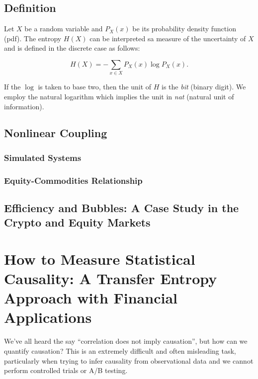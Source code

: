 \documentclass[]{book}
\theoremstyle{definition}
\theoremstyle{definition}
\theoremstyle{definition}
\theoremstyle{remark}
\begin{document}
\section{Definition}\label{definition}

Let \(X\) be a random variable and \(P_X(x)\) be its probability density
function (pdf). The entropy \(H(X)\) can be interpreted sa measure of
the uncertainty of \(X\) and is defined in the discrete case as follows:

\begin{equation}
H(X) = -\sum_{x \in X}{P_X(x)\log{P_X(x)}}.
\label{eq:H}
\end{equation}

If the \(\log\) is taken to base two, then the unit of \(H\) is the
\textit{bit} (binary digit). We employ the natural logarithm which
implies the unit in \textit{nat} (natural unit of information).

\section{Nonlinear Coupling}\label{nonlinear-coupling}

\subsection{Simulated Systems}\label{simulated-systems}

\subsection{Equity-Commodities
Relationship}\label{equity-commodities-relationship}

\section{Efficiency and Bubbles: A Case Study in the Crypto and Equity
Markets}\label{efficiency-and-bubbles-a-case-study-in-the-crypto-and-equity-markets}

\chapter{How to Measure Statistical Causality: A Transfer Entropy
Approach with Financial
Applications}\label{how-to-measure-statistical-causality-a-transfer-entropy-approach-with-financial-applications}

We've all heard the say ``correlation does not imply causation'', but
how can we quantify causation? This is an extremely difficult and often
misleading task, particularly when trying to infer causality from
observational data and we cannot perform controlled trials or A/B
testing.
\end{document}
